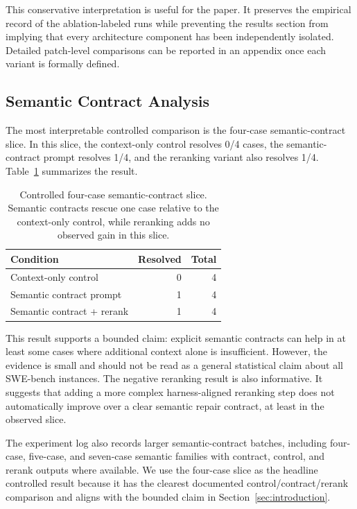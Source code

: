 \documentclass[11pt]{article}
\begin{document}
This conservative interpretation is useful for the paper.  It preserves the empirical record of the ablation-labeled runs while preventing the results section from implying that every architecture component has been independently isolated.  Detailed patch-level comparisons can be reported in an appendix once each variant is formally defined.

\subsection{Semantic Contract Analysis}
\label{subsec:semantic-contract-results}

The most interpretable controlled comparison is the four-case semantic-contract slice.  In this slice, the context-only control resolves 0/4 cases, the semantic-contract prompt resolves 1/4, and the reranking variant also resolves 1/4.  Table~\ref{tab:semantic-contract} summarizes the result.

\begin{table}[t]
\centering
\small
\begin{tabular}{lrr}
\toprule
Condition & Resolved & Total \\
\midrule
Context-only control & 0 & 4 \\
Semantic contract prompt & 1 & 4 \\
Semantic contract + rerank & 1 & 4 \\
\bottomrule
\end{tabular}
\caption{Controlled four-case semantic-contract slice.  Semantic contracts rescue one case relative to the context-only control, while reranking adds no observed gain in this slice.}
\label{tab:semantic-contract}
\end{table}

This result supports a bounded claim: explicit semantic contracts can help in at least some cases where additional context alone is insufficient.  However, the evidence is small and should not be read as a general statistical claim about all SWE-bench instances.  The negative reranking result is also informative.  It suggests that adding a more complex harness-aligned reranking step does not automatically improve over a clear semantic repair contract, at least in the observed slice.

The experiment log also records larger semantic-contract batches, including four-case, five-case, and seven-case semantic families with contract, control, and rerank outputs where available.  We use the four-case slice as the headline controlled result because it has the clearest documented control/contract/rerank comparison and aligns with the bounded claim in Section~\ref{sec:introduction}.
\end{document}
